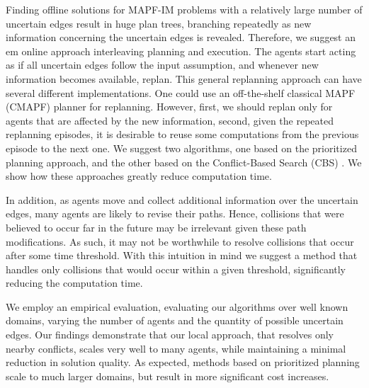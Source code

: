 \documentclass[letterpaper]{article} %
\def\
UrlFont{\rm}  %
\newcommand{\plan}[1]{\textbf{[\color{blue}PLAN:#1]}}
\theoremstyle{definition}
\begin{document}
Finding offline solutions for MAPF-IM problems with a relatively large number of uncertain edges result in huge plan trees, branching repeatedly as new information concerning the uncertain edges is revealed. Therefore, we suggest an {em online} approach interleaving planning and execution. The agents start acting as if all uncertain edges follow the input assumption, and whenever new information becomes available, replan.
This general replanning approach can have several different implementations. One could use an off-the-shelf classical MAPF (CMAPF) planner for replanning. However, first, we should replan only for agents that are affected by the new information, second, given the repeated replanning episodes, it is desirable to reuse some computations from the previous episode to the next one. We suggest two algorithms, one based on the prioritized planning \cite{silver2005cooperative} approach, and the other based on the Conflict-Based Search (CBS) \cite{sharon2015conflict}. We show how these approaches greatly reduce computation time.

In addition, as agents move and collect additional information over the uncertain edges, many agents are likely to revise their paths. Hence, collisions that were believed to occur far in the future may be irrelevant given these path modifications. As such, it may not be worthwhile to resolve collisions that occur after some time threshold. With this intuition in mind we suggest a method that handles only collisions that would occur within a given threshold, significantly reducing the computation time.

We employ an empirical evaluation, evaluating our algorithms over well known domains, varying the number of agents and the quantity of possible uncertain edges.
Our findings demonstrate that our local approach, that resolves only nearby conflicts, scales very well to many agents, while maintaining a minimal reduction in solution quality. As expected, methods based on prioritized planning scale to much larger domains, but result in more significant cost increases.







\end{document}
